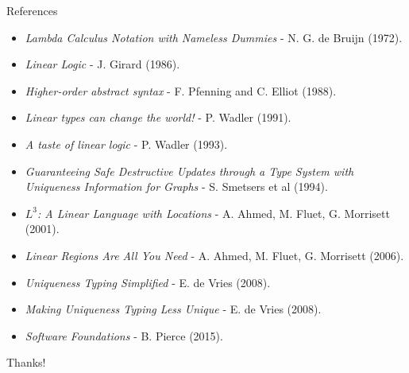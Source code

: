 \documentclass[10pt]{beamer}
\begin{document}
\begin{frame}{References}
\begin{itemize}
\item \textit{Lambda Calculus Notation with Nameless Dummies} - N. G. de Bruijn (1972).
\item \textit{Linear Logic} - J. Girard (1986).
\item \textit{Higher-order abstract syntax} - F. Pfenning and C. Elliot (1988).
\item \textit{Linear types can change the world!} - P. Wadler (1991).
\item \textit{A taste of linear logic} - P. Wadler (1993).
\item \textit{Guaranteeing Safe Destructive Updates through a Type System with Uniqueness Information for Graphs} - S. Smetsers et al (1994).
\item \textit{$L^3$: A Linear Language with Locations} - A. Ahmed, M. Fluet, G. Morrisett (2001).
\item \textit{Linear Regions Are All You Need} - A. Ahmed, M. Fluet, G. Morrisett (2006).
\item \textit{Uniqueness Typing Simplified} - E. de Vries (2008).
\item \textit{Making Uniqueness Typing Less Unique} - E. de Vries (2008).
\item \textit{Software Foundations} - B. Pierce (2015).
\end{itemize}
\end{frame}

\begin{frame}
\begin{center}
\Large Thanks!
\end{center}
\end{frame}
\end{document}
